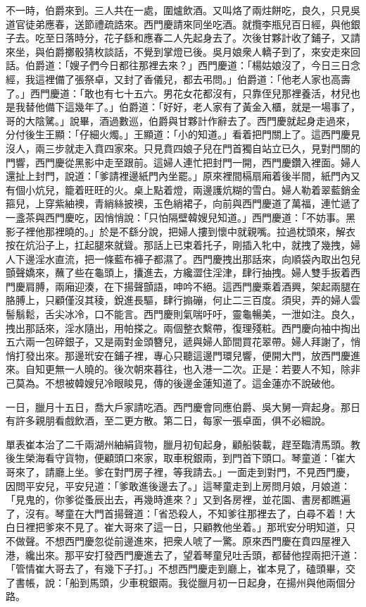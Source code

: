 不一時，伯爵來到。三人共在一處，圍爐飲酒。又叫烙了兩炷餅吃，良久，只見吳道官徒弟應春，送節禮疏誥來。西門慶請來同坐吃酒。就攬李瓶兒百日經，與他銀子去。吃至日落時分，花子繇和應春二人先起身去了。次後甘夥計收了鋪子，又請來坐，與伯爵擲骰猜枚談話，不覺到掌燈已後。吳月娘衆人轎子到了，來安走來回話。伯爵道：「嫂子們今日都往那裡去來？」西門慶道：「楊姑娘沒了，今日三日念經，我這裡備了張祭卓，又封了香儀兒，都去弔問。」伯爵道：「他老人家也高壽了。」西門慶道：「敢也有七十五六。男花女花都沒有，只靠侄兒那裡養活，材兒也是我替他備下這幾年了。」伯爵道：「好好，老人家有了黃金入櫃，就是一場事了，哥的大陰騭。」說畢，酒過數巡，伯爵與甘夥計作辭去了。西門慶就起身走過來，分付後生王顯：「仔細火燭。」王顯道：「小的知道。」看着把門關上了。這西門慶見沒人，兩三步就走入賁四家來。只見賁四娘子兒在門首獨自站立已久，見對門關的門響，西門慶從黑影中走至跟前。這婦人連忙把封門一開，西門慶鑽入裡面。婦人還扯上封門，說道：「爹請裡邊紙門內坐罷。」原來裡間槅扇廂着後半間，紙門內又有個小炕兒，籠着旺旺的火。桌上點着燈，兩邊護炕糊的雪白。婦人勒着翠藍銷金箍兒，上穿紫紬襖，青綃絲披襖，玉色綃裙子，向前與西門慶道了萬福，連忙遞了一盞茶與西門慶吃，因悄悄說：「只怕隔壁韓嫂兒知道。」西門慶道：「不妨事。黑影子裡他那裡曉的。」{}於是不繇分說，把婦人摟到懷中就親嘴。拉過枕頭來，解衣按在炕沿子上，扛起腿來就聳。那話上已束着托子，剛插入牝中，就拽了幾拽，婦人下邊淫水直流，把一條藍布褲子都濕了。西門慶拽出那話來，向順袋內取出包兒顫聲嬌來，蘸了些在龜頭上，攮進去，方纔澀住淫津，肆行抽拽。婦人雙手扳着西門慶肩膊，兩廂迎湊，在下揚聲顫語，呻吟不絕。這西門慶乘着酒興，架起兩腿在胳膊上，只顧僅沒其稜，銳進長驅，肆行搧磞，何止二三百度。須臾，弄的婦人雲髻鬅鬆，舌尖冰冷，口不能言。西門慶則氣喘吁吁，靈龜暢美，一泄如注。良久，拽出那話來，淫水隨出，用帕搽之。兩個整衣繫帶，復理殘粧。西門慶向袖中掏出五六兩一包碎銀子，又是兩對金頭簪兒，遞與婦人節間買花翠帶。婦人拜謝了，悄悄打發出來。那邊玳安在鋪子裡，專心只聽這邊門環兒響，便開大門，放西門慶進來。自知更無一人曉的。後次朝來暮往，也入港一二次。正是：若要人不知，除非己莫為。不想被韓嫂兒冷眼睃見，傳的後邊金蓮知道了。這金蓮亦不說破他。

一日，臘月十五日，喬大戶家請吃酒。西門慶會同應伯爵、吳大舅一齊起身。那日有許多親朋看戲飲酒，至二更方散。第二日，每家一張卓面，俱不必細說。

單表崔本治了二千兩湖州紬絹貨物，臘月初旬起身，顧船裝載，趕至臨清馬頭。教後生榮海看守貨物，便顧頭口來家，取車稅銀兩，到門首下頭口。琴童道：「崔大哥來了，請廳上坐。爹在對門房子裡，等我請去。」一面走到對門，不見西門慶，因問平安兒，平安兒道：「爹敢進後邊去了。」這琴童走到上房問月娘，月娘道：「見鬼的，你爹從蚤辰出去，再幾時進來？」又到各房裡，並花園、書房都瞧遍了，沒有。琴童在大門首揚聲道：「省恐殺人，不知爹往那裡去了，白尋不着！大白日裡把爹來不見了。崔大哥來了這一日，只顧教他坐着。」那玳安分明知道，只不做聲。{}不想西門慶忽從前邊進來，把衆人唬了一驚。原來西門慶在賁四屋裡入港，纔出來。那平安打發西門慶進去了，望着琴童兒吐舌頭，都替他捏兩把汗道：「管情崔大哥去了，有幾下子打。」不想西門慶走到廳上，崔本見了，磕頭畢，交了書帳，說：「船到馬頭，少車稅銀兩。我從臘月初一日起身，在揚州與他兩個分路。

